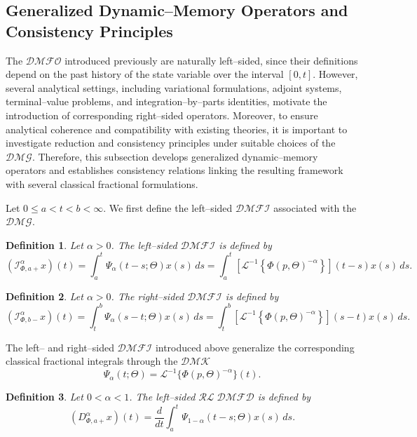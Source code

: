 \documentclass[11pt]{article}
\numberwithin{equation}{section}
\newtheorem{definition}{Definition}[section]
\begin{document}
\subsection{Generalized Dynamic–Memory Operators and Consistency Principles}

The $\mathcal{DMFO}$  introduced previously are naturally
left--sided, since their definitions depend on the past history of the state
variable over the interval \([0,t]\). However, several analytical settings,
including variational formulations, adjoint systems, terminal--value problems,
and integration--by--parts identities, motivate the introduction of corresponding
right--sided operators. Moreover, to ensure analytical coherence and compatibility
with existing theories, it is important to investigate reduction and consistency
principles under suitable choices of the $\mathcal{DMG}$. Therefore, this subsection develops
generalized dynamic--memory operators and establishes consistency relations linking
the resulting framework with several classical fractional formulations.

\medskip

Let \(0\le a<t<b<\infty\). We first define the left--sided $\mathcal{DMFI}$ associated with the $\mathcal{DMG}$.

\begin{definition}
Let \(\alpha>0\). The left--sided $\mathcal{DMFI}$ is defined by
\[
(\mathcal I^{\alpha}_{\Phi,a+}x)(t)
=
\int_{a}^{t}
\Psi_{\alpha}(t-s;\Theta)x(s)\,ds
=
\int_a^t
\left[
\mathcal L^{-1}
\left\{
\Phi(p,\Theta)^{-\alpha}
\right\}
\right](t-s)
x(s)\,ds.
\]
\end{definition}

\begin{definition}
Let \(\alpha>0\). The right--sided $\mathcal{DMFI}$ is defined by
\[
(\mathcal I^{\alpha}_{\Phi,b-}x)(t)
=
\int_{t}^{b}
\Psi_{\alpha}(s-t;\Theta)x(s)\,ds
=
\int_t^b
\left[
\mathcal L^{-1}
\left\{
\Phi(p,\Theta)^{-\alpha}
\right\}
\right](s-t)
x(s)\,ds.
\]
\end{definition}
\noindent 
The left-- and right--sided $\mathcal{DMFI}$ introduced above
generalize the corresponding classical fractional integrals through the $\mathcal{DMK}$
\[
\Psi_{\alpha}(t;\Theta)
=
\mathcal L^{-1}
\{
\Phi(p,\Theta)^{-\alpha}
\}(t).
\]

\begin{definition}
Let \(0<\alpha<1\). The left--sided $\mathcal{RL\;DMFD}$ is defined by
\[
(D^{\alpha}_{\Phi,a+}x)(t)
=
\frac{d}{dt}
\int_{a}^{t}
\Psi_{1-\alpha}(t-s;\Theta)x(s)\,ds.
\]
\end{definition}
\end{document}
